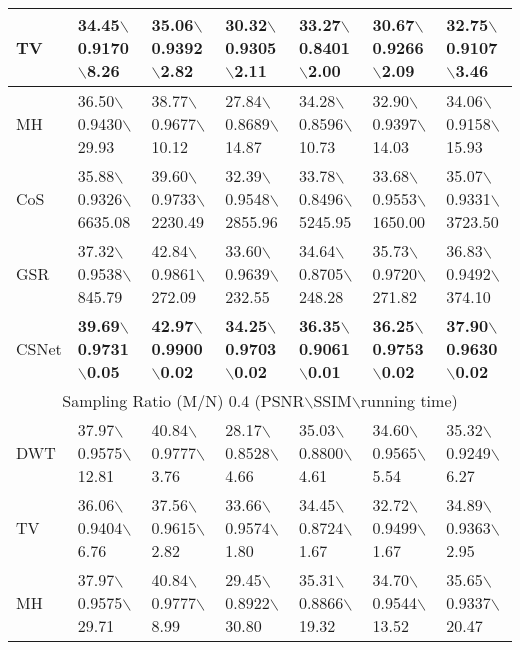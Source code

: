 \documentclass[5pt]{article}
\begin{document}
\begin{table*}[t]
\begin{tabular}{|l|l|l|l|l|l|l|}
\hline
TV & 34.45$\backslash$0.9170$\backslash$8.26 & 35.06$\backslash$0.9392$\backslash$2.82 & 30.32$\backslash$0.9305$\backslash$2.11 & 33.27$\backslash$0.8401$\backslash$2.00 & 30.67$\backslash$0.9266$\backslash$2.09 & 32.75$\backslash$0.9107$\backslash$3.46\\
\hline
MH & 36.50$\backslash$0.9430$\backslash$29.93 & 38.77$\backslash$0.9677$\backslash$10.12 & 27.84$\backslash$0.8689$\backslash$14.87 & 34.28$\backslash$0.8596$\backslash$10.73 & 32.90$\backslash$0.9397$\backslash$14.03 & 34.06$\backslash$0.9158$\backslash$15.93\\
\hline
CoS & 35.88$\backslash$0.9326$\backslash$\tiny 6635.08 & 39.60$\backslash$0.9733$\backslash$\tiny 2230.49 & 32.39$\backslash$0.9548$\backslash$\tiny 2855.96 & 33.78$\backslash$0.8496$\backslash$\tiny 5245.95 & 33.68$\backslash$0.9553$\backslash$\tiny 1650.00 & 35.07$\backslash$0.9331$\backslash$\tiny 3723.50\\
\hline
GSR & 37.32$\backslash$0.9538$\backslash$845.79 & 42.84$\backslash$0.9861$\backslash$272.09 & 33.60$\backslash$0.9639$\backslash$232.55 & 34.64$\backslash$0.8705$\backslash$248.28 & 35.73$\backslash$0.9720$\backslash$271.82 & 36.83$\backslash$0.9492$\backslash$374.10\\
\hline
CSNet & \textbf{39.69}$\backslash$\textbf{0.9731}$\backslash$\textbf{0.05} & \textbf{42.97}$\backslash$\textbf{0.9900}$\backslash$\textbf{0.02} & \textbf{34.25}$\backslash$\textbf{0.9703}$\backslash$\textbf{0.02} & \textbf{36.35}$\backslash$\textbf{0.9061}$\backslash$\textbf{0.01} & \textbf{36.25}$\backslash$\textbf{0.9753}$\backslash$\textbf{0.02} & \textbf{37.90}$\backslash$\textbf{0.9630}$\backslash$\textbf{0.02}\\
\hline
\multicolumn{7}{|c|}{Sampling Ratio (M/N) 0.4 (PSNR$\backslash$SSIM$\backslash$running time)}\\
\hline
DWT & 37.97$\backslash$0.9575$\backslash$12.81 & 40.84$\backslash$0.9777$\backslash$3.76 & 28.17$\backslash$0.8528$\backslash$4.66 & 35.03$\backslash$0.8800$\backslash$4.61 & 34.60$\backslash$0.9565$\backslash$5.54 & 35.32$\backslash$0.9249$\backslash$6.27\\
\hline
TV & 36.06$\backslash$0.9404$\backslash$6.76 & 37.56$\backslash$0.9615$\backslash$2.82 & 33.66$\backslash$0.9574$\backslash$1.80 & 34.45$\backslash$0.8724$\backslash$1.67 & 32.72$\backslash$0.9499$\backslash$1.67 & 34.89$\backslash$0.9363$\backslash$2.95\\
\hline
MH & 37.97$\backslash$0.9575$\backslash$29.71 & 40.84$\backslash$0.9777$\backslash$8.99 & 29.45$\backslash$0.8922$\backslash$30.80 & 35.31$\backslash$0.8866$\backslash$19.32 & 34.70$\backslash$0.9544$\backslash$13.52 & 35.65$\backslash$0.9337$\backslash$20.47\\

\end{tabular}
\end{table*}
\end{document}
